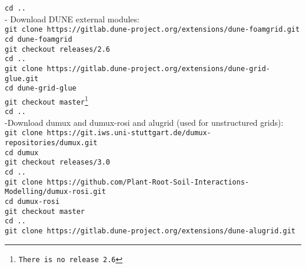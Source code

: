		\hspace{\parindent} \texttt{cd ..}\\
- Download DUNE external modules:\\
\texttt{git clone https://gitlab.dune-project.org/extensions/dune-foamgrid.git}\\
    \hspace{\parindent} \texttt{cd dune-foamgrid}\\
    \hspace{\parindent} \texttt{git checkout releases/2.6}\\
		\hspace{\parindent} \texttt{cd ..}\\
\texttt{git clone https://gitlab.dune-project.org/extensions/dune-grid-glue.git}\\
    \hspace{\parindent} \texttt{cd dune-grid-glue}\\
    \hspace{\parindent} \texttt{git checkout master\footnote{There is no release 2.6}}\\
		\hspace{\parindent} \texttt{cd ..}\\

-Download dumux and dumux-rosi and alugrid (used for unstructured grids):\\
\texttt{git clone https://git.iws.uni-stuttgart.de/dumux-repositories/dumux.git}\\
    \hspace{\parindent} \texttt{cd dumux}\\
    \hspace{\parindent} \texttt{git checkout releases/3.0}\\
		\hspace{\parindent} \texttt{cd ..}\\
\texttt{git clone https://github.com/Plant-Root-Soil-Interactions-Modelling/dumux-rosi.git}\\
    \hspace{\parindent} \texttt{cd dumux-rosi}\\
    \hspace{\parindent} \texttt{git checkout master}\\
		\hspace{\parindent} \texttt{cd ..}\\
\texttt{git clone https://gitlab.dune-project.org/extensions/dune-alugrid.git}\\

